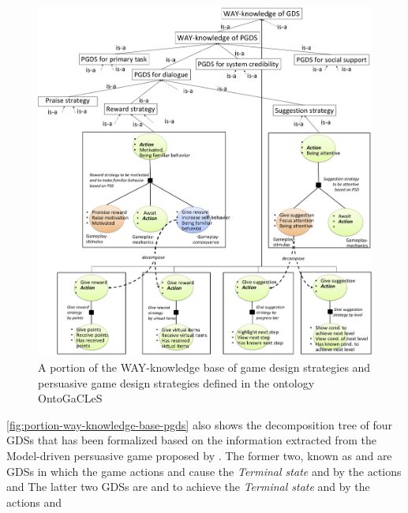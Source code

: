 \begin{figure}[!htb]
 \caption{A portion of the WAY-knowledge base of game design strategies and persuasive game design strategies defined in the ontology OntoGaCLeS}
 \label{fig:portion-way-knowledge-base-pgds}
 \centering
 \includegraphics[width=1\textwidth]{images/chap-ontogacles2/portion-way-knowledge-base-pgds.png}
 \fautor
\end{figure}

\autoref{fig:portion-way-knowledge-base-pgds} also shows the decomposition tree of four GDSs that has been formalized based on the information extracted from the Model-driven persuasive game proposed by . The former two, known as  and  are GDSs in which the game actions  and  cause the \emph{Terminal state}  and  by the actions  and  The latter two GDSs are  and  to achieve the \emph{Terminal state}   and  by the actions  and 

